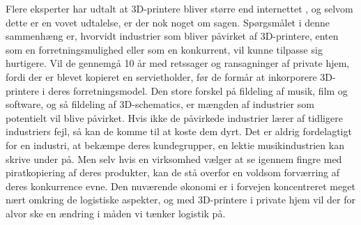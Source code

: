 Flere eksperter har udtalt at 3D-printere bliver større end internettet \autocite{financial_times_3d_2012}, og selvom dette er en vovet udtalelse, er der nok noget om sagen. Spørgsmålet i denne sammenhæng er, hvorvidt industrier som bliver påvirket af 3D-printere, enten som en forretningsmulighed eller som en konkurrent, vil kunne tilpasse sig hurtigere. Vil de gennemgå 10 år med retssager og ransagninger af private hjem, fordi der er blevet kopieret en servietholder, før de formår at inkorporere 3D-printere i deres forretningsmodel.
Den store forskel på fildeling af musik, film og software, og så fildeling af 3D-schematics, er mængden af industrier som potentielt vil blive påvirket. Hvis ikke de påvirkede industrier lærer af tidligere industriers fejl, så kan de komme til at koste dem dyrt. Det er aldrig fordelagtigt for en industri, at bekæmpe deres kundegrupper, en lektie musikindustrien kan skrive under på. Men selv hvis en virksomhed vælger at se igennem fingre med piratkopiering af deres produkter, kan de stå overfor en voldsom forværring af deres konkurrence evne.
Den nuværende økonomi er i forvejen koncentreret meget nært omkring de logistiske aspekter, og med 3D-printere i private hjem vil der for alvor ske en ændring i måden vi tænker logistik på.
